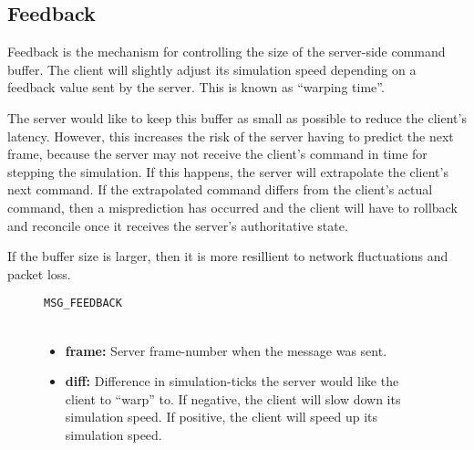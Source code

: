 \subsection{Feedback}

Feedback is the mechanism for controlling  the size of the server-side command
buffer. The  client  will  slightly adjust its simulation speed depending on a
feedback value sent  by  the  server.  This  is  known  as  ``warping  time''.

\begin{center}

\end{center}

The server would like to keep this buffer  as  small as possible to reduce the
client's latency. However, this increases the risk  of  the  server  having to
predict  the  next frame, because the server  may  not  receive  the  client's
command in time for stepping the simulation. If  this happens, the server will
extrapolate the  client's  next  command.  If the extrapolated command differs
from  the client's actual command, then a misprediction has occurred  and  the
client  will have to rollback and reconcile  once  it  receives  the  server's
authoritative state.

If  the  buffer  size  is  larger,  then  it  is  more  resillient  to network
fluctuations and packet loss.

\vspace{1.5em}

\begin{figure}[h]
\verb$MSG_FEEDBACK$\\
\vspace{.25em}\\

\begin{itemize}
\item\textbf{frame:} Server frame-number when the message was sent.
\item\textbf{diff:}  Difference in simulation-ticks the server would like  the
client  to ``warp'' to. If negative, the client will slow down its  simulation
speed.  If  positive,  the  client  will  speed  up  its   simulation   speed.
\end{itemize}
\end{figure}

\vspace{1.5em}
